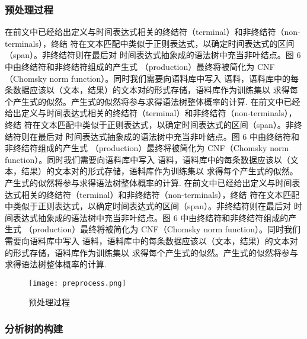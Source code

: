 \subsubsection{预处理过程}

在前文中已经给出定义与时间表达式相关的终结符（terminal）和非终结符（non-terminals），终结
符在文本匹配中类似于正则表达式，以确定时间表达式的区间（span）。非终结符则在最后对
时间表达式抽象成的语法树中充当非叶结点。图 6 中由终结符和非终结符组成的产生式
（production）最终将被简化为 CNF（Chomsky norm function）。同时我们需要向语料库中写入
语料，语料库中的每条数据应该以（文本，结果）的文本对的形式存储，语料库作为训练集以
求得每个产生式的似然。产生式的似然将参与求得语法树整体概率的计算.
在前文中已经给出定义与时间表达式相关的终结符（terminal）和非终结符（non-terminals），终结
符在文本匹配中类似于正则表达式，以确定时间表达式的区间（span）。非终结符则在最后对
时间表达式抽象成的语法树中充当非叶结点。图 6 中由终结符和非终结符组成的产生式
（production）最终将被简化为 CNF（Chomsky norm function）。同时我们需要向语料库中写入
语料，语料库中的每条数据应该以（文本，结果）的文本对的形式存储，语料库作为训练集以
求得每个产生式的似然。产生式的似然将参与求得语法树整体概率的计算.
在前文中已经给出定义与时间表达式相关的终结符（terminal）和非终结符（non-terminals），终结
符在文本匹配中类似于正则表达式，以确定时间表达式的区间（span）。非终结符则在最后对
时间表达式抽象成的语法树中充当非叶结点。图 6 中由终结符和非终结符组成的产生式
（production）最终将被简化为 CNF（Chomsky norm function）。同时我们需要向语料库中写入
语料，语料库中的每条数据应该以（文本，结果）的文本对的形式存储，语料库作为训练集以
求得每个产生式的似然。产生式的似然将参与求得语法树整体概率的计算.

\begin{figure}[h]
    \centering
    \texttt{[image: preprocess.png]}
    \caption{预处理过程}
    \label{fig:badge}
\end{figure}

\subsubsection{分析树的构建}

